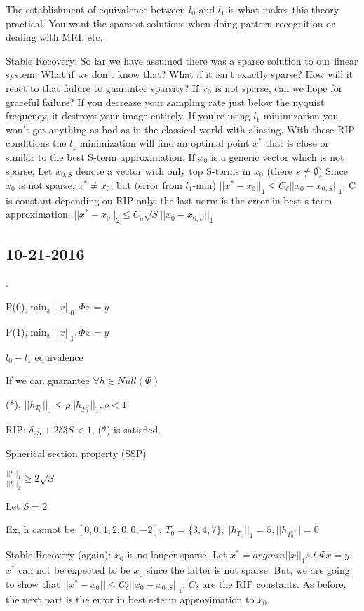 \documentclass[12pt,letterpaper]{report}
\begin{document}
The establishment of equivalence between $l_0$ and $l_1$ is what makes this theory practical.  You want the sparsest solutions when doing pattern recognition or dealing with MRI, etc.

Stable Recovery: So far we have assumed there was a sparse solution to our linear system.  What if we don't know that?  What if it isn't exactly sparse?  How will it react to that failure to guarantee sparsity?  If $x_0$ is not sparse, can we hope for graceful failure?  If you decrease your sampling rate just below the nyquist frequency, it destroys your image entirely.  If you're using $l_1$ minimization you won't get anything as bad as in the classical world with aliasing.  With these RIP conditions the $l_1$ minimization will find an optimal point $x^*$ that is close or similar to the best S-term approximation.  If $x_0$ is a generic vector which is not sparse, Let $x_{0,S}$ denote a vector with only top S-terms in $x_0$ (there $s \neq \emptyset$)  Since $x_0$ is not sparse, $x^* \neq	 x_0$, but (error from $l_1$-min) $||x^* - x_0||_1 \leq C_\delta ||x_0 - x_{0,S}||_1$, C is constant depending on RIP only, the last norm is the error in best s-term approximation.  $||x^* - x_0||_2 \leq C_\delta \sqrt{S}||x_0 - x_{0,S}||_1$

\subsection*{10-21-2016}

.

P(0),$\min_x||x||_0, \Phi x = y$

P(1),$\min_x||x||_1, \Phi x = y$

$l_0 - l_1$ equivalence

If we can guarantee $\forall h \in Null(\Phi)$

(*), $||h_{T_0}||_1 \leq \rho || h_{T_0^C}||_1, \rho < 1$

RIP: $\delta_{2S} + 2\delta{3S} < 1$, (*) is satisfied.

Spherical section property (SSP)

$\frac{||h||_1}{||h||_2} \geq 2 \sqrt{S}$

Let $S = 2$

Ex, h cannot be $[0, 0, 1, 2, 0, 0, -2]$, $T_0 = \{3,4,7\}, ||h_{T_0}||_1 = 5, ||h_{T_0^C}|| = 0$

Stable Recovery (again): $x_0$ is no longer sparse.  Let $x^* = argmin ||x||_1 s.t. \Phi x = y$.  $x^*$ can not be expected to be $x_0$ since the latter is not sparse.  But, we are going to show that $||x^* - x_0|| \leq C_\delta ||x_0 - x_{0,S}||_1$, $C_\delta$ are the RIP constants.  As before, the next part is the error in best s-term approximation to $x_0$.
\end{document}
